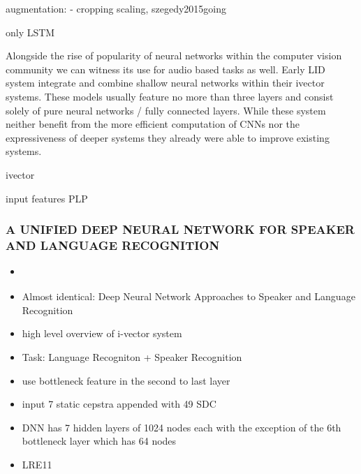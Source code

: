 augmentation:
- cropping scaling, {szegedy2015going}

only LSTM \cite{gonzalez2014automatic, graves2013speech, abdic2015detecting}

Alongside the rise of popularity of neural networks within the computer vision community we can witness its use for audio based tasks as well. Early LID system integrate and combine shallow neural networks within their ivector systems\cite{gonzalez2014automatic, han2013trap, matejka2014neural, van2014transfer}. These models usually feature no more than three layers and consist solely of pure neural networks / fully connected layers. While these system neither benefit from the more efficient computation of CNNs nor the expressiveness of deeper systems they already were able to improve existing systems.


ivector
\cite{dehak2011language}

input features PLP \cite{gonzalez2014automatic}

    \subsubsection{A UNIFIED DEEP NEURAL NETWORK FOR SPEAKER AND LANGUAGE RECOGNITION}
    \begin{itemize}
        \item \cite{richardson2015unified}
        \item Almost identical: Deep Neural Network Approaches to Speaker and Language Recognition \cite{richardson2015deep}
        \item high level overview of i-vector system
        \item Task: Language Recogniton + Speaker Recognition
        \item use bottleneck feature in the second to last layer
        \item input 7 static cepstra appended with 49 SDC
        \item DNN has 7 hidden layers of 1024 nodes each with the exception of the 6th bottleneck layer which has 64 nodes
        \item LRE11
    \end{itemize}
    
